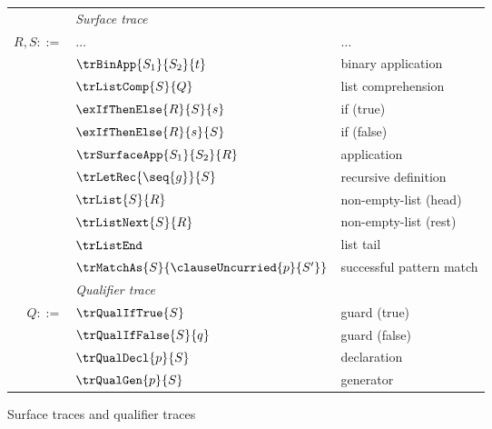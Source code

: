 \begin{figure}
   \begin{minipage}[t]{0.52\textwidth}
      \begin{tabularx}{\textwidth}{rL{2.8cm}L{3.4cm}}
         &\textit{Surface trace}&
         \\
         $R, S ::=$
         &
         $\dots$
         &
         $\dots$
         \\
         &
         $\trBinApp{S_1}{S_2}{t}$
         &
         binary application
         \\
         &
         $\trListComp{S}{Q}$
         &
         list comprehension
         \\
         &
         $\exIfThenElse{R}{S}{s}$
         &
         if (true)
         \\
         &
         $\exIfThenElse{R}{s}{S}$
         &
         if (false)
         \\
         &
         $\trSurfaceApp{S_1}{S_2}{R}$
         &
         application
         \\
         &
         $\trLetRec{\seq{g}}{S}$
         &
         recursive definition
         \\
         &
         $\trList{S}{R}$
         &
         non-empty-list (head)
         \\
         &
         $\trListNext{S}{R}$
         &
         non-empty-list (rest)
         \\
         &
         $\trListEnd$
         &
         list tail
         \\
         &
         $\trMatchAs{S}{\clauseUncurried{p}{S'}}$
         &
         successful pattern match
         \\[2mm]
         &\textit{Qualifier trace}&
         \\
         $Q ::=$
         &
         $\trQualIfTrue{S}$
         &
         guard (true)
         \\
         &
         $\trQualIfFalse{S}{q}$
         &
         guard (false)
         \\
         &
         $\trQualDecl{p}{S}$
         &
         declaration
         \\
         &
         $\trQualGen{p}{S}$
         &
         generator
         \\[2mm]

      \end{tabularx}
   \end{minipage}%
   \caption{Surface traces and qualifier traces}
\end{figure}
